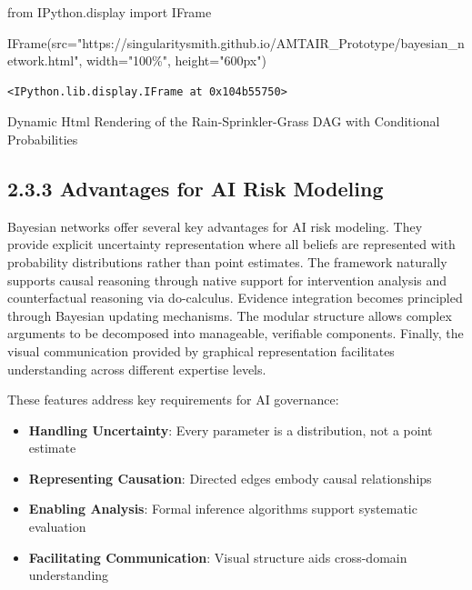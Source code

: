 \documentclass[
  11pt,
  letterpaper,
]{book}
\newenvironment{Shaded}{\begin{snugshade}}{\end{snugshade}}
\newcommand{\ImportTok}[1]{\textcolor[rgb]{0.00,0.46,0.62}{#1}}
\newcommand{\NormalTok}[1]{\textcolor[rgb]{0.00,0.23,0.31}{#1}}
\newcommand{\OperatorTok}[1]{\textcolor[rgb]{0.37,0.37,0.37}{#1}}
\newcommand{\StringTok}[1]{\textcolor[rgb]{0.13,0.47,0.30}{#1}}
\providecommand{\tightlist}{%
  \setlength{\itemsep}{0pt}\setlength{\parskip}{0pt}}
\begin{document}
\begin{Shaded}
\begin{Highlighting}[]
\ImportTok{from}\NormalTok{ IPython.display }\ImportTok{import}\NormalTok{ IFrame}

\NormalTok{IFrame(src}\OperatorTok{=}\StringTok{"https://singularitysmith.github.io/AMTAIR\_Prototype/bayesian\_network.html"}\NormalTok{, width}\OperatorTok{=}\StringTok{"100\%"}\NormalTok{, height}\OperatorTok{=}\StringTok{"600px"}\NormalTok{)}
\end{Highlighting}
\end{Shaded}

\label{rain_sprinkler_grass_example_network_rendering}
\begin{verbatim}
<IPython.lib.display.IFrame at 0x104b55750>
\end{verbatim}

Dynamic Html Rendering of the Rain-Sprinkler-Grass DAG with Conditional
Probabilities

\subsection*{2.3.3 Advantages for AI Risk
Modeling}\label{sec-modeling-advantages}

Bayesian networks offer several key advantages for AI risk modeling.
They provide explicit uncertainty representation where all beliefs are
represented with probability distributions rather than point estimates.
The framework naturally supports causal reasoning through native support
for intervention analysis and counterfactual reasoning via do-calculus.
Evidence integration becomes principled through Bayesian updating
mechanisms. The modular structure allows complex arguments to be
decomposed into manageable, verifiable components. Finally, the visual
communication provided by graphical representation facilitates
understanding across different expertise levels.

These features address key requirements for AI governance:

\begin{itemize}
\tightlist
\item
  \textbf{Handling Uncertainty}: Every parameter is a distribution, not
  a point estimate
\item
  \textbf{Representing Causation}: Directed edges embody causal
  relationships
\item
  \textbf{Enabling Analysis}: Formal inference algorithms support
  systematic evaluation
\item
  \textbf{Facilitating Communication}: Visual structure aids
  cross-domain understanding
\end{itemize}
\end{document}
